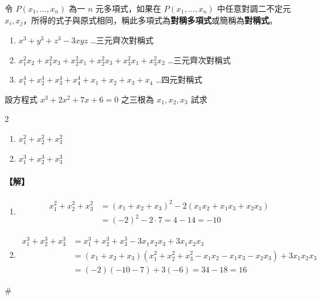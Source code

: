 \begin{definition}\label{def:b6-2-symmetric}
令 $P(x_1, \dots, x_n)$ 為一 $n$ 元多項式，如果在 $P(x_1, \dots, x_n)$ 中任意對調二不定元 $x_i, x_j$，所得的式子與原式相同，稱此多項式為\textbf{對稱多項式}或簡稱為\textbf{對稱式}。
\end{definition}

\begin{example}\label{ex:b6-2-10}
\begin{enumerate}[label=(\arabic*), leftmargin=2em]
  \item $x^3+y^3+z^3-3xyz$ \dots 三元齊次對稱式
  \item $x_1^2 x_2 + x_1^2 x_3 + x_2^2 x_1 + x_2^2 x_3 + x_3^2 x_1 + x_3^2 x_2$ \dots 三元齊次對稱式
  \item $x_1^4+x_2^4+x_3^4+x_4^4+x_1+x_2+x_3+x_4$ \dots 四元對稱式
\end{enumerate}
\end{example}

\begin{example}\label{ex:b6-2-11}
設方程式 $x^3+2x^2+7x+6=0$ 之三根為 $x_1, x_2, x_3$ 試求
\begin{multicols}{2}
\begin{enumerate}[label=(\roman*)]
  \item $x_1^2+x_2^2+x_3^2$
  \item $x_1^3+x_2^3+x_3^3$
\end{enumerate}
\end{multicols}
\end{example}

\paragraph{【解】}
\begin{enumerate}[label=(\roman*), leftmargin=2em]
  \item
  \begin{align*}
  x_1^2+x_2^2+x_3^2 &= (x_1+x_2+x_3)^2 - 2(x_1 x_2 + x_1 x_3 + x_2 x_3) \\
  &= (-2)^2 - 2 \cdot 7 = 4 - 14 = -10
  \end{align*}
  \item
  \begin{align*}
  x_1^3+x_2^3+x_3^3 &= x_1^3+x_2^3+x_3^3-3x_1 x_2 x_3 + 3x_1 x_2 x_3 \\
  &= (x_1+x_2+x_3)(x_1^2+x_2^2+x_3^2 - x_1 x_2 - x_1 x_3 - x_2 x_3) + 3x_1 x_2 x_3 \\
  &= (-2)(-10-7) + 3(-6) = 34 - 18 = 16
  \end{align*}
\end{enumerate}
\hfill$\#$

